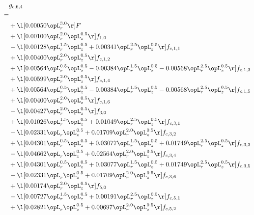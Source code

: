 \begin{alignat}{2} 
\label{eq:g_64_0} 
& g_{c,6,4} \nonumber \\ 
 = \\ 
& + \l[  0.00050 \opL_r^{3.0}  \r] F \nonumber \\ 
& + \l[  0.00100 \opL_r^{2.0} \opL_z^{0.5}  \r] f_{1,0} \nonumber \\ 
& - \l[  0.00128 \opL_r^{1.5} \opL_z^{0.5} +  0.00341 \opL_r^{2.5} \opL_z^{0.5}  \r] f_{c,1,1} \nonumber \\ 
& + \l[  0.00400 \opL_r^{2.0} \opL_z^{0.5}  \r] f_{c,1,2} \nonumber \\ 
& + \l[  0.00564 \opL_r^{0.5} \opL_z^{0.5}   -0.00384 \opL_r^{1.5} \opL_z^{0.5}   -0.00568 \opL_r^{2.5} \opL_z^{0.5}  \r] f_{c,1,3} \nonumber \\ 
& + \l[  0.00599 \opL_r^{2.0} \opL_z^{0.5}  \r] f_{c,1,4} \nonumber \\ 
& + \l[  0.00564 \opL_r^{0.5} \opL_z^{0.5}   -0.00384 \opL_r^{1.5} \opL_z^{0.5}   -0.00568 \opL_r^{2.5} \opL_z^{0.5}  \r] f_{c,1,5} \nonumber \\ 
& + \l[  0.00400 \opL_r^{2.0} \opL_z^{0.5}  \r] f_{c,1,6} \nonumber \\ 
& - \l[  0.00427 \opL_r^{2.0} \opL_z^{0.5}  \r] f_{3,0} \nonumber \\ 
& + \l[  0.01026 \opL_r^{1.5} \opL_z^{0.5} +  0.01049 \opL_r^{2.5} \opL_z^{0.5}  \r] f_{c,3,1} \nonumber \\ 
& - \l[  0.02331 \opL_r \opL_z^{0.5} +  0.01709 \opL_r^{2.0} \opL_z^{0.5}  \r] f_{c,3,2} \nonumber \\ 
& + \l[  0.04301 \opL_r^{0.5} \opL_z^{0.5} +  0.03077 \opL_r^{1.5} \opL_z^{0.5} +  0.01749 \opL_r^{2.5} \opL_z^{0.5}  \r] f_{c,3,3} \nonumber \\ 
& - \l[  0.04662 \opL_r \opL_z^{0.5} +  0.02564 \opL_r^{2.0} \opL_z^{0.5}  \r] f_{c,3,4} \nonumber \\ 
& + \l[  0.04301 \opL_r^{0.5} \opL_z^{0.5} +  0.03077 \opL_r^{1.5} \opL_z^{0.5} +  0.01749 \opL_r^{2.5} \opL_z^{0.5}  \r] f_{c,3,5} \nonumber \\ 
& - \l[  0.02331 \opL_r \opL_z^{0.5} +  0.01709 \opL_r^{2.0} \opL_z^{0.5}  \r] f_{c,3,6} \nonumber \\ 
& + \l[  0.00174 \opL_r^{2.0} \opL_z^{0.5}  \r] f_{5,0} \nonumber \\ 
& - \l[  0.00727 \opL_r^{1.5} \opL_z^{0.5} +  0.00191 \opL_r^{2.5} \opL_z^{0.5}  \r] f_{c,5,1} \nonumber \\ 
& + \l[  0.02821 \opL_r \opL_z^{0.5} +  0.00697 \opL_r^{2.0} \opL_z^{0.5}  \r] f_{c,5,2} \nonumber \\ 

\end{alignat}
